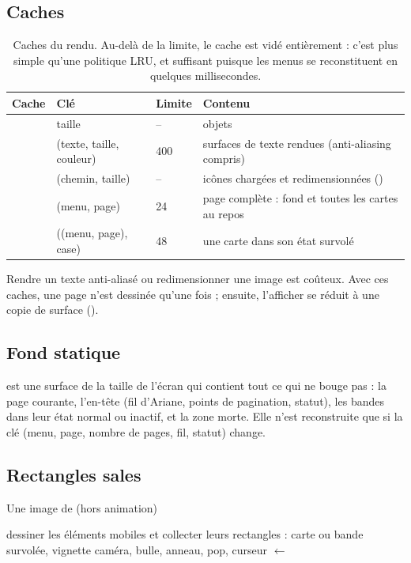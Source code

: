 \subsection{Caches}

\begin{table}[H]
\centering\small
\begin{tabularx}{\textwidth}{@{}l l l L@{}}
\toprule
Cache & Clé & Limite & Contenu \\
\midrule
{} & taille & -- & objets  \\
 & (texte, taille, couleur) & 400 & surfaces de texte rendues (anti-aliasing compris) \\
 & (chemin, taille) & -- & icônes chargées et redimensionnées () \\
 & (menu, page) & 24 & page complète : fond et toutes les cartes au repos \\
 & ((menu, page), case) & 48 & une carte dans son état survolé \\
\bottomrule
\end{tabularx}
\caption{Caches du rendu. Au-delà de la limite, le cache est vidé entièrement : c'est plus simple qu'une politique LRU, et suffisant puisque les menus se reconstituent en quelques millisecondes.}
\end{table}

Rendre un texte anti-aliasé ou redimensionner une image est coûteux. Avec ces caches, une page n'est dessinée qu'une fois ; ensuite, l'afficher se réduit à une copie de surface ().

\subsection{Fond statique}

 est une surface de la taille de l'écran qui contient tout ce qui ne bouge pas : la page courante, l'en-tête (fil d'Ariane, points de pagination, statut), les bandes dans leur état normal ou inactif, et la zone morte. Elle n'est reconstruite que si la clé (menu, page, nombre de pages, fil, statut) change.

\subsection{Rectangles sales}

\begin{algorithm}[H]
\caption{Une image de  (hors animation)}
dessiner les éléments mobiles et collecter leurs rectangles : carte ou bande survolée, vignette caméra, bulle, anneau, pop, curseur\;
 $\leftarrow$ \;
\end{algorithm}

